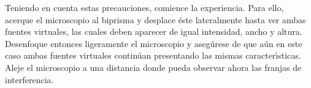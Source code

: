 \documentclass[laboratorio]{guia}
\begin{document}
Teniendo en cuenta estas precauciones, comience la experiencia. Para ello,
acerque el microscopio al biprisma y desplace \'este lateralmente hasta ver
ambas fuentes virtuales, las cuales deben aparecer de igual intensidad, ancho
y altura. Desenfoque entonces ligeramente el microscopio y aseg\'urese de que
a\'un en este caso ambas fuentes virtuales contin\'uan presentando las mismas
caracter\'\i sticas. Aleje el microscopio a una distancia donde pueda observar ahora las franjas de
interferencia.

\nocite{Alonso1998,Jenkins2001,Hecht1986}
 

        
\end{document}
